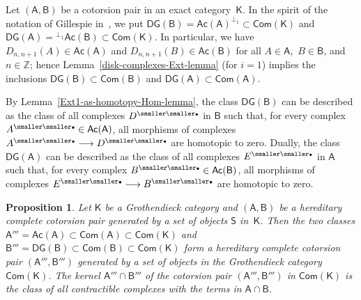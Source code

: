 \documentclass[12pt,a4paper]{amsart}
\newcommand{\+}{\nobreakdash-}
\renewcommand{\:}{\colon}
\newcommand{\rarrow}{\longrightarrow}
\newcommand{\bu}{{\text{\smaller\smaller$\scriptstyle\bullet$}}}
\newcommand{\sA}{\mathsf A}
\newcommand{\sB}{\mathsf B}
\newcommand{\sK}{\mathsf K}
\newcommand{\sS}{\mathsf S}
\newcommand{\Com}{\mathsf{Com}}
\newcommand{\Ac}{\mathsf{Ac}}
\newcommand{\DG}{\mathsf{DG}}
\newcommand{\boZ}{\mathbb Z}
\theoremstyle{plain}
\newtheorem{prop}[thm]{Proposition}
\theoremstyle{definition}
\begin{document}
 Let $(\sA,\sB)$ be a cotorsion pair in an exact category~$\sK$.
 In the spirit of the notation of Gillespie in~\cite{Gil,Gil3},
we put $\DG(\sB)=\Ac(\sA)^{\perp_1}\subset\Com(\sK)$ and
$\DG(\sA)={}^{\perp_1}\Ac(\sB)\subset\Com(\sK)$.
 In particular, we have $D_{n,n+1}(A)\in\Ac(\sA)$ and $D_{n,n+1}(B)\in
\Ac(\sB)$ for all $A\in\sA$, \,$B\in\sB$, and $n\in\boZ$; hence
Lemma~\ref{disk-complexes-Ext-lemma} (for $i=1$) implies the inclusions
$\DG(\sB)\subset\Com(\sB)$ and $\DG(\sA)\subset\Com(\sA)$.

 By Lemma~\ref{Ext1-as-homotopy-Hom-lemma}, the class $\DG(\sB)$ can
be described as the class of all complexes $D^\bu$ in $\sB$ such that,
for every complex $A^\bu\in\Ac(\sA)$, all morphisms of complexes
$A^\bu\rarrow D^\bu$ are homotopic to zero.
 Dually, the class $\DG(\sA)$ can be described as the class of all
complexes $E^\bu$ in $\sA$ such that, for every complex
$B^\bu\in\Ac(\sB)$, all morphisms of complexes $E^\bu\rarrow B^\bu$
are homotopic to zero.

\begin{prop} \label{acyclic-dg-cotorsion-pair-prop}
 Let\/ $\sK$ be a Grothendieck category and $(\sA,\sB)$ be
a hereditary complete cotorsion pair generated by a set of objects\/
$\sS$ in\/~$\sK$.
 Then the two classes\/ $\sA'''=\Ac(\sA)\subset\Com(\sA)\subset
\Com(\sK)$ and\/ $\sB'''=\DG(\sB)\subset\Com(\sB)\subset\Com(\sK)$
form a hereditary complete cotorsion pair $(\sA''',\sB''')$ generated
by a set of objects in the Grothendieck category\/ $\Com(\sK)$.
 The kernel\/ $\sA'''\cap\sB'''$ of the cotorsion pair $(\sA''',\sB''')$
in\/ $\Com(\sK)$ is the class of all contractible complexes with
the terms in\/ $\sA\cap\sB$.
\end{prop}
\end{document}
